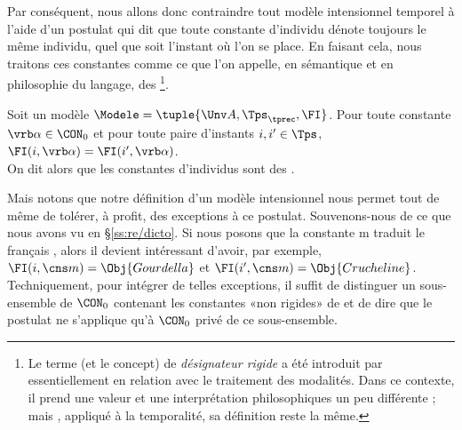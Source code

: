 Par conséquent, nous allons donc contraindre tout modèle intensionnel temporel à l'aide d'un postulat qui dit que toute constante d'individu dénote toujours le même individu, quel que soit l'instant où l'on se place.  
En faisant cela, nous traitons ces constantes comme ce que l'on appelle, en sémantique et en philosophie du langage, des \footnote{Le terme (et le concept) de \emph{désignateur rigide} a été introduit par \citet{Kripke:72} essentiellement en relation avec le traitement des modalités. Dans ce contexte, il prend une valeur et une interprétation philosophiques un peu différente ; mais , appliqué à la temporalité, sa définition reste la même.}\label{drigide1}.

\begin{postu}\label{postu:DR1}
Soit un modèle $\Modele=\tuple{\Unv A,\Tps_{\tprec},\FI}$. Pour toute constante $\vrb\alpha\in\CON_0$ et pour toute paire d'instants $i,i'\in \Tps$, 
\(\FI(i,\vrb\alpha)=\FI(i',\vrb\alpha)\).
\\
On dit alors que les constantes d'individus sont des .
\end{postu}


Mais notons que notre définition d'un modèle intensionnel nous permet tout de même de tolérer, à profit, des exceptions à ce postulat.
Souvenons-nous de ce que nous avons vu en \S\ref{ss:re/dicto}.  
Si nous posons que la constante \cns m traduit le {\GN} français , alors il devient intéressant d'avoir, par exemple, \(\FI(i,\cns m)=\Obj{Gourdella}\) et \(\FI(i',\cns m)=\Obj{Crucheline}\). Techniquement, pour intégrer de telles exceptions, il suffit de distinguer un sous-ensemble de $\CON_0$ contenant les constantes «non rigides» de {\LO} et de dire que le postulat ne s'applique qu'à $\CON_0$ privé de ce sous-ensemble. 

